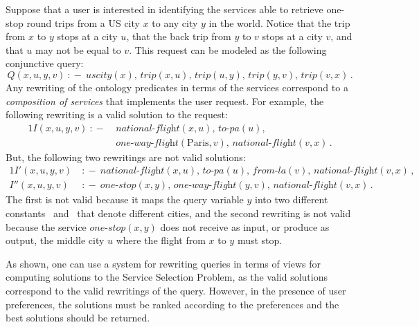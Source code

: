 \documentclass{llncs}
\newcommand{\qrule}{:\!\!-}
\newcommand{\trip}{\textit{trip}}
\newcommand{\UScity}{\textit{uscity}}
\newcommand{\PA}{\text{Paris}}
\newcommand{\LA}{\text{LA}}
\newcommand{\nationalFlight}{\textit{national-flight}}
\newcommand{\onewayFlight}{\textit{one-way-flight}}
\newcommand{\onestop}{\textit{one-stop}}
\newcommand{\toPA}{\textit{to-pa}}
\newcommand{\fromLA}{\textit{from-la}}
\begin{document}
Suppose that a user is interested in identifying the services able to retrieve
one-stop round trips from a US city $x$ to any city $y$ in the world. Notice
that the trip from $x$ to $y$ stops at a city $u$, that the back trip from $y$
to $v$ stops at a city $v$, and that $u$ may not be equal to $v$.
This request can be modeled as the following conjunctive query:
\[ Q(x,u,y,v)\ \qrule\ \UScity(x),\,\trip(x,u),\,\trip(u,y),\,\trip(y,v),\,\trip(v,x)\,. \]
Any rewriting of the ontology predicates in terms of the services correspond
to a \emph{composition of services} that implements the user request.
For example, the following rewriting is a valid solution to the request:
\begin{alignat*}{1}
I(x,u,y,v)\ \qrule\ &\nationalFlight(x,u),\,\toPA(u),\, \\
                    &\onewayFlight(\PA,v),\,\nationalFlight(v,x)\,. 
\end{alignat*}
But, the following two rewritings are not valid solutions:
\begin{alignat*}{1}
 I'(x,u,y,v)\  &\qrule\ \nationalFlight(x,u),\,\toPA(u),\,\fromLA(v),\,\nationalFlight(v,x)\,, \\
I''(x,u,y,v)\  &\qrule\ \onestop(x,y),\,\onewayFlight(y,v),\,\nationalFlight(v,x)\,.
\end{alignat*}
The first is not valid because it maps the query variable $y$ into two different
constants \PA\ and \LA\ that denote different cities, and the second rewriting is
not valid because the service $\onestop(x,y)$ does not receive as input, or produce
as output, the middle city $u$ where the flight from $x$ to $y$ must stop.

As shown, one can use a system for rewriting queries in terms of views
for computing solutions to the Service Selection Problem, as the valid
solutions correspond to the valid rewritings of the query. However, in
the presence of user preferences, the solutions must be ranked according
to the preferences and the best solutions should be returned.
\end{document}
